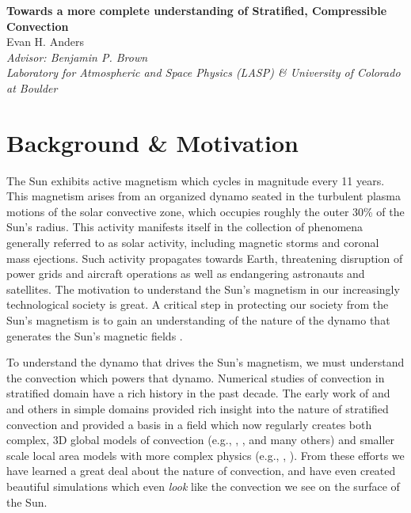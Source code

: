 \documentclass[aasms,12pt]{article}
\begin{document}
\begin{center}
   \large\textbf{Towards a more complete understanding of Stratified, Compressible Convection}\\
   \vspace{0.4cm}
   \large{Evan H. Anders}\\
   \vspace{0.4cm}
   \normalsize\textit{Advisor: Benjamin P. Brown}\\
   \normalsize\textit{Laboratory for Atmospheric and Space Physics (LASP) \& University of Colorado at Boulder}\\
\end{center}

\section{Background \& Motivation}
The Sun exhibits active magnetism which cycles in magnitude every 11 years.
This magnetism arises from an 
organized dynamo seated in the turbulent plasma
motions of the solar convective zone, which occupies roughly the outer 30\%
of the Sun's radius. This activity manifests itself in the collection of phenomena generally
referred to as solar activity, including magnetic storms and coronal mass
ejections.  Such activity propagates towards Earth, threatening disruption of 
power grids and aircraft operations as well as endangering astronauts and satellites.
The motivation to understand the Sun's magnetism in our increasingly technological society
is great.  A critical step in protecting our society from the Sun's magnetism is 
to gain an understanding of the nature of the dynamo that generates the Sun's magnetic fields
\cite{nordlund&all2009, charbonneau2014}.

To understand the dynamo that drives the Sun's magnetism, we must understand the convection
which powers that dynamo.  Numerical studies of convection in stratified domain have a
rich history in the past decade.  The early work of \cite{graham1975} and \cite{hurlburt&all1984} and others in simple
domains provided rich insight into the nature of stratified convection and provided a basis
in a field which now regularly creates both complex, 3D global models of convection
(e.g., \cite{brown&all2010}, \cite{guerrero&all2016}, and many others)
and smaller scale local area models with more complex physics 
(e.g., \cite{stein&nordlund2012}, \cite{rempel2014}).
From these efforts we have learned a great deal about the nature of convection, and have
even created beautiful simulations which even \emph{look} like the convection we see on the
surface of the Sun.
\end{document}
